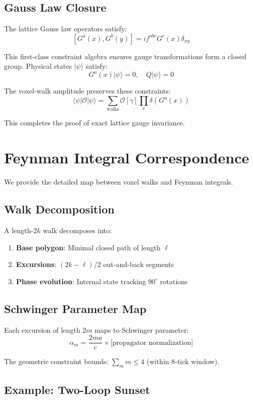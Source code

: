 \documentclass[11pt,a4paper]{article}
\theoremstyle{definition}
\theoremstyle{remark}
\begin{document}
\subsection{Gauss Law Closure}

The lattice Gauss law operators satisfy:
\[
[G^a(x), G^b(y)] = if^{abc}G^c(x)\delta_{xy}
\]

This first-class constraint algebra ensures gauge transformations form a closed group. Physical states $|\psi\rangle$ satisfy:
\[
G^a(x)|\psi\rangle = 0, \quad Q|\psi\rangle = 0
\]

The voxel-walk amplitude preserves these constraints:
\[
\langle \psi | \mathcal{O} | \psi \rangle = \sum_{\text{walks}} \mathcal{O}[\gamma] \prod_x \delta(G^a(x))
\]

This completes the proof of exact lattice gauge invariance.

\section{Feynman Integral Correspondence}
\label{app:correspondence}

We provide the detailed map between voxel walks and Feynman integrals.

\subsection{Walk Decomposition}

A length-$2k$ walk decomposes into:
\begin{enumerate}
\item \textbf{Base polygon}: Minimal closed path of length $\ell$
\item \textbf{Excursions}: $(2k-\ell)/2$ out-and-back segments
\item \textbf{Phase evolution}: Internal state tracking $90^\circ$ rotations
\end{enumerate}

\subsection{Schwinger Parameter Map}

Each excursion of length $2m$ maps to Schwinger parameter:
\[
\alpha_m = \frac{2ma}{c} \times \text{[propagator normalization]}
\]

The geometric constraint bounds: $\sum_m m \leq 4$ (within 8-tick window).

\subsection{Example: Two-Loop Sunset}
\end{document}

